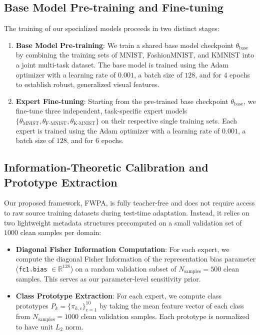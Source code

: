 \documentclass{article}
\theoremstyle{plain}
\theoremstyle{definition}
\theoremstyle{remark}
\begin{document}
\subsection{Base Model Pre-training and Fine-tuning}
The training of our specialized models proceeds in two distinct stages:
\begin{enumerate}
    \item \textbf{Base Model Pre-training}: We train a shared base model checkpoint $\theta_{\text{base}}$ by combining the training sets of MNIST, FashionMNIST, and KMNIST into a joint multi-task dataset. The base model is trained using the Adam optimizer with a learning rate of $0.001$, a batch size of $128$, and for $4$ epochs to establish robust, generalized visual features.
    \item \textbf{Expert Fine-tuning}: Starting from the pre-trained base checkpoint $\theta_{\text{base}}$, we fine-tune three independent, task-specific expert models $\{\theta_{\text{MNIST}}, \theta_{\text{F-MNIST}}, \theta_{\text{K-MNIST}}\}$ on their respective single training sets. Each expert is trained using the Adam optimizer with a learning rate of $0.001$, a batch size of $128$, and for $6$ epochs.
\end{enumerate}

\subsection{Information-Theoretic Calibration and Prototype Extraction}
Our proposed framework, FWPA, is fully teacher-free and does not require access to raw source training datasets during test-time adaptation. Instead, it relies on two lightweight metadata structures precomputed on a small validation set of $1000$ clean samples per domain:
\begin{itemize}
    \item \textbf{Diagonal Fisher Information Computation}: For each expert, we compute the diagonal Fisher Information of the representation bias parameter (\texttt{fc1.bias} $\in \mathbb{R}^{128}$) on a random validation subset of $N_{\text{samples}} = 500$ clean samples. This serves as our parameter-level sensitivity prior.
    \item \textbf{Class Prototype Extraction}: For each expert, we compute class prototypes $P_k = \{\pi_{k, c}\}_{c=1}^{10}$ by taking the mean feature vector of each class from $N_{\text{samples}} = 1000$ clean validation samples. Each prototype is normalized to have unit $L_2$ norm.
\end{itemize}
\end{document}
